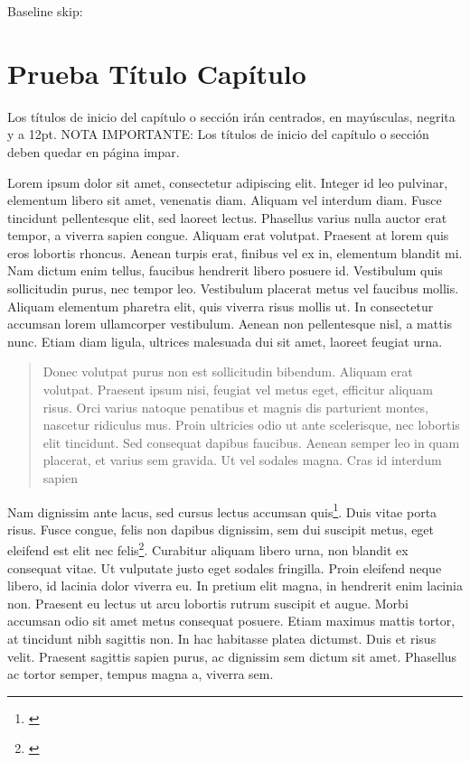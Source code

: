 
\currentpage
\pagediagram
\pagevalues

\currentpage
\pagedesign

Baseline skip:
\the\baselineskip

\chapter{Prueba Título Capítulo}
Los títulos de inicio del capítulo o sección irán centrados, en mayúsculas, negrita y a 12pt. NOTA IMPORTANTE: Los títulos de inicio del capítulo o sección deben quedar en página impar.

Lorem ipsum dolor sit amet, consectetur adipiscing elit. Integer id leo pulvinar, elementum libero sit amet, venenatis diam. Aliquam vel interdum diam. Fusce tincidunt pellentesque elit, sed laoreet lectus. Phasellus varius nulla auctor erat tempor, a viverra sapien congue. Aliquam erat volutpat. Praesent at lorem quis eros lobortis rhoncus. Aenean turpis erat, finibus vel ex in, elementum blandit mi. Nam dictum enim tellus, faucibus hendrerit libero posuere id\autocite[Cf.][12]{teichmann2008ans}.
Vestibulum quis sollicitudin purus, nec tempor leo. Vestibulum placerat metus vel faucibus mollis. Aliquam elementum pharetra elit, quis viverra risus mollis ut. In consectetur accumsan lorem ullamcorper vestibulum. Aenean non pellentesque nisl, a mattis nunc. Etiam diam ligula, ultrices malesuada dui sit amet, laoreet feugiat urna. \blockquote[{\Cite[12]{teichmann2008ans}}]{Donec volutpat purus non est sollicitudin bibendum. Aliquam erat volutpat. Praesent ipsum nisi, feugiat vel metus eget, efficitur aliquam risus. Orci varius natoque penatibus et magnis dis parturient montes, nascetur ridiculus mus. Proin ultricies odio ut ante scelerisque, nec lobortis elit tincidunt. Sed consequat dapibus faucibus. Aenean semper leo in quam placerat, et varius sem gravida. Ut vel sodales magna. Cras id interdum sapien}.

Nam dignissim ante lacus, sed cursus lectus accumsan quis\footnote{\Cite[Cf.][12]{teichmann2008ans}}. Duis vitae porta risus. Fusce congue, felis non dapibus dignissim, sem dui suscipit metus, eget eleifend est elit nec felis\footnote{\cite[14]{teichmann2008ans}}. Curabitur aliquam libero urna, non blandit ex consequat vitae. Ut vulputate justo eget sodales fringilla. Proin eleifend neque libero, id lacinia dolor viverra eu. In pretium elit magna, in hendrerit enim lacinia non. Praesent eu lectus ut arcu lobortis rutrum suscipit et augue. Morbi accumsan odio sit amet metus consequat posuere. Etiam maximus mattis tortor, at tincidunt nibh sagittis non. In hac habitasse platea dictumst. Duis et risus velit. Praesent sagittis sapien purus, ac dignissim sem dictum sit amet. Phasellus ac tortor semper, tempus magna a, viverra sem.

